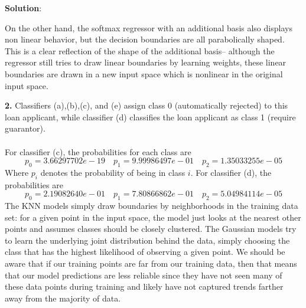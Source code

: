 \documentclass[submit]{../harvardml}
\newenvironment{solution}{
    \vspace{2mm}
    \color{black}\noindent\textbf{Solution}:
}{}
\begin{document}
\begin{solution}
\begin{tcolorbox}
        On the other hand, the softmax regressor with an additional basis also displays non linear behavior, but the decision boundaries are all parabolically shaped. This is a clear reflection of the shape of the additional basis-- although the regressor still tries to draw linear boundaries by learning weights, these linear boundaries are drawn in a new input space which is nonlinear in the original input space.
    \end{tcolorbox}
    \begin{tcolorbox}
        \textbf{2.} Classifiers (a),(b),(c), and (e) assign class 0 (automatically rejected) to this loan applicant, while classifier (d) classifies the loan applicant as class 1 (require guarantor). 
        \\
        \\
        For classifier (c), the probabilities for each class are
        $$p_0 = 3.66297702e-19 \quad p_1 = 9.99986497e-01 \quad p_2 = 1.35033255e-05$$
        Where $p_i$ denotes the probability of being in class $i$. For classifier (d), the probabilities are
        $$p_0 = 2.19082640e-01 \quad p_1 = 7.80866862e-01 \quad p_2 = 5.04984114e-05$$
        The KNN models simply draw boundaries by neighborhoods in the training data set: for a given point in the input space, the model just looks at the nearest other points and assumes classes should be closely clustered. The Gaussian models try to learn the underlying joint distribution behind the data, simply choosing the class that has the highest likelihood of observing a given point. We should be aware that if our training points are far from our training data, then that means that our model predictions are less reliable since they have not seen many of these data points during training and likely have not captured trends farther away from the majority of data. 
    \end{tcolorbox}
    \begin{tcolorbox}

\end{tcolorbox}
\end{solution}
\end{document}
